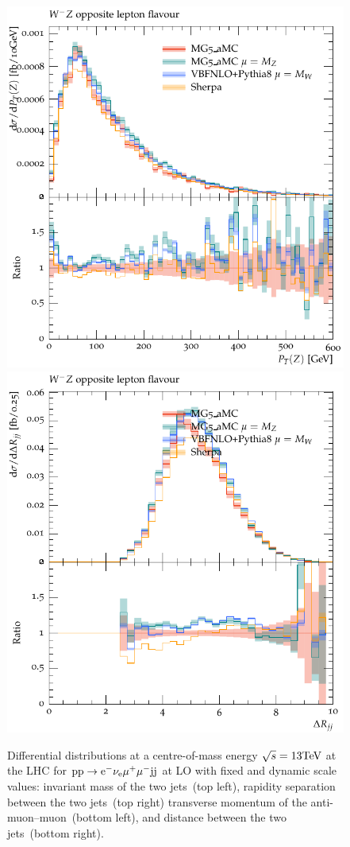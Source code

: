 \begin{figure}[htbp]
\begin{center}
   \includegraphics[scale=0.65]{figs/WmZ_OF_ZPt}
   \includegraphics[scale=0.65]{figs/WmZ_OF_dRjj}
\caption{Differential distributions at a centre-of-mass energy $\sqrt{s}=13{\rm TeV}$ at the LHC for ${\rm p} {\rm p}
  \to {\rm e}^-  \nu_{\rm e}  \mu^+ \mu^- {\rm j} {\rm j}$ at LO with fixed and dynamic scale values:  
                invariant mass of the two jets~(top left),
                rapidity separation between the two jets~(top right)
                transverse momentum of the anti-muon--muon~(bottom left), and
                distance between the two jets~(bottom right).}
\label{vbs_fig_shower_3a}
\end{center}
\end{figure}

